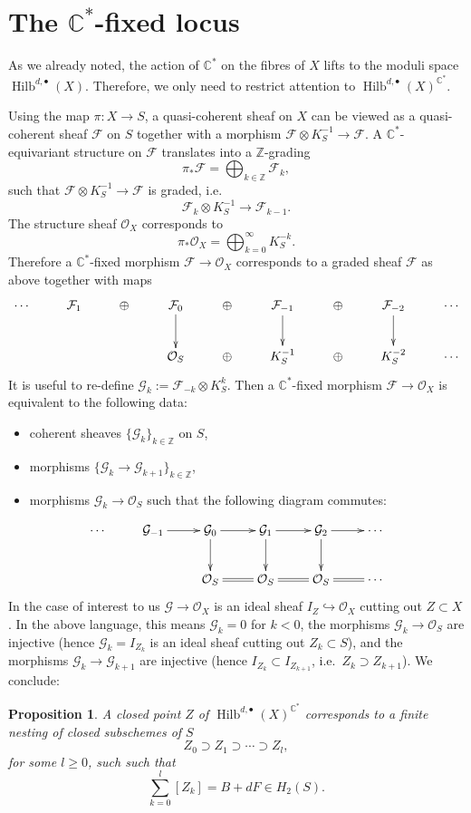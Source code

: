 \documentclass{amsart}
\newtheorem{proposition}[theorem]{Proposition}
\theoremstyle{definition}
\newcommand{\CC} {\mathbb{C}}          %
\newcommand{\ZZ} {\mathbb{Z}}		%
\renewcommand{\O}{\mathcal{O}}
\newcommand{\Hilb}{\operatorname{Hilb}}
\newcommand{\F}{\mathcal{F}}
\newcommand{\G}{\mathcal{G}}
\begin{document}
\section{The $\CC^*$-fixed locus} \label{fixedlocus}

As we already noted, the action of $\CC^*$ on the fibres of $X$ lifts to the moduli space $\Hilb^{d,\bullet}(X)$. 
Therefore, we only need to restrict attention to $\Hilb^{d,\bullet}(X)^{\CC^*}$. 

Using the map $\pi : X \rightarrow S$, a quasi-coherent sheaf on $X$ can be viewed as a quasi-coherent sheaf $\F$ on $S$ together with a morphism $\F \otimes K_{S}^{-1} \rightarrow \F$. A $\CC^*$-equivariant structure on $\F$ translates into a $\ZZ$-grading
$$
\pi_* \F = \bigoplus_{k \in \ZZ} \F_k,
$$
such that $\F \otimes K_{S}^{-1} \rightarrow \F$ is graded, i.e.
$$
\F_k \otimes K_{S}^{-1} \longrightarrow \F_{k-1}.
$$
The structure sheaf $\O_X$ corresponds to 
$$
\pi_* \O_X = \bigoplus_{k=0}^{\infty} K_{S}^{-k}.
$$
Therefore a $\CC^*$-fixed morphism $\F \rightarrow \O_X$ corresponds to a graded sheaf $\F$ as above together with maps
\begin{displaymath}
\xymatrix
{
\cdots & \F_1 & \oplus & \F_0 \ar[d] & \oplus & \F_{-1} \ar[d] & \oplus & \F_{-2} \ar[d] & \cdots \\
& & & \O_S & \oplus & K_{S}^{-1} & \oplus & K_{S}^{-2} & \cdots 
}
\end{displaymath}
It is useful to re-define $\G_k := \F_{-k} \otimes K_{S}^{k}$. Then a $\CC^*$-fixed morphism $\F \rightarrow \O_X$ is equivalent to the following data:
\begin{itemize}
\item coherent sheaves $\{\G_k\}_{k \in \ZZ}$ on $S$,
\item morphisms $\{\G_k \rightarrow \G_{k+1}\}_{k \in \ZZ}$,
\item morphisms $\G_k \rightarrow \O_S$ such that the following diagram commutes:
\end{itemize}
\begin{displaymath}
\xymatrix
{
\cdots & \G_{-1} \ar[r] & \G_0 \ar[r] \ar[d] & \G_{1} \ar[r] \ar[d] & \G_{2} \ar[r] \ar[d] & \cdots \\
& & \O_S \ar@{=}[r]& \O_S \ar@{=}[r] & \O_S \ar@{=}[r] & \cdots 
}
\end{displaymath}
In the case of interest to us $\G \rightarrow \O_X$ is an ideal sheaf $I_Z \hookrightarrow \O_X$ cutting out $Z \subset X$. In the above language, this means $\G_k = 0$ for $k<0$, the morphisms $\G_k \rightarrow \O_S$ are injective (hence $\G_k = I_{Z_k}$ is an ideal sheaf cutting out $Z_k \subset S$), and the morphisms $\G_k \rightarrow \G_{k+1}$ are injective (hence $I_{Z_k} \subset I_{Z_{k+1}}$, i.e.~$Z_{k} \supset Z_{k+1}$). We conclude:
\begin{proposition}
A closed point $Z$ of $\Hilb^{d,\bullet}(X)^{\CC^*}$ corresponds to a finite nesting of closed subschemes of $S$
$$
Z_{0} \supset Z_{1} \supset \cdots \supset Z_{l},
$$
for some $l \geq 0$, such such that
$$
\sum_{k=0}^{l} [Z_k] = B + dF \in H_2(S).
$$
\end{proposition}
\end{document}
